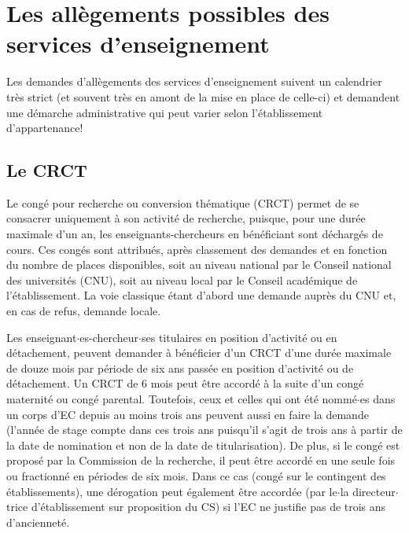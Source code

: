 \section{Les all\`egements possibles des services d'enseignement}

Les demandes d'all\`egements des services d'enseignement suivent un calendrier tr\`es strict
(et souvent tr\`es en amont de la mise en place de celle-ci)
et demandent une d\'emarche administrative qui peut varier selon l'\'etablissement d'appartenance!

\subsection{Le CRCT}
\label{CRCT}


Le cong\'e pour recherche ou conversion th\'ematique (CRCT) permet
de se consacrer uniquement \`a son activit\'e de recherche, puisque,
pour une dur\'ee maximale d'un an, les enseignants-chercheurs en
b\'en\'eficiant sont d\'echarg\'es de cours. Ces cong\'es sont
attribu\'es, apr\`es classement des demandes et en fonction du nombre
de places disponibles, soit au niveau national par le Conseil
national des universit\'es (CNU), soit  au niveau local par le Conseil
acad\'emique de l'\'etablissement. La voie classique \'etant d'abord une demande
aupr\`es du CNU et, en cas de refus, demande locale.

Les enseignant$\cdot$es-chercheur$\cdot$ses titulaires en position d'activit\'e ou en d\'etachement,
peuvent demander \`a b\'en\'eficier d'un CRCT d'une dur\'ee maximale
de douze mois par p\'eriode de six ans pass\'ee en position
d'activit\'e ou de d\'etachement. Un CRCT de 6 mois peut \^etre accord\'e
\`a la suite d'un cong\'e maternit\'e ou cong\'e parental.
Toutefois, ceux et celles qui ont \'et\'e
nomm\'e$\cdot$es dans un corps d'EC depuis au moins trois ans peuvent aussi
en faire la demande (l'ann\'ee de stage compte dans ces trois ans
puisqu'il s'agit de trois ans \`a partir de la date de nomination et
non de la date de titularisation). De plus, si le cong\'e est
propos\'e par la Commission de la recherche, il peut \^etre accord\'e en
une seule fois ou fractionn\'e en p\'eriodes de six mois.
 Dans ce cas (cong\'e sur le contingent des
\'etablissements), une d\'erogation peut \'egalement \^etre accord\'ee
(par le$\cdot$la directeur$\cdot$trice d'\'etablissement sur proposition
du CS) si l'EC ne justifie pas de trois ans d'anciennet\'e.

